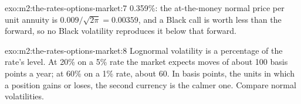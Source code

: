 \begin{solution}{exo:m2:the-rates-options-market:7}
0.359\%: the at-the-money normal price per unit annuity is
$0.009/\sqrt{2\pi} = 0.00359$, and a Black call is worth less than the forward,
so no Black volatility reproduces it below that forward.
\end{solution}

\begin{solution}{exo:m2:the-rates-options-market:8}
Lognormal volatility is a percentage of the rate's level. At 20\% on a 5\% rate
the market expects moves of about 100 basis points a year; at 60\% on a 1\% rate,
about 60. In basis points, the units in which a position gains or loses, the
second currency is the calmer one. Compare normal volatilities.
\end{solution}

